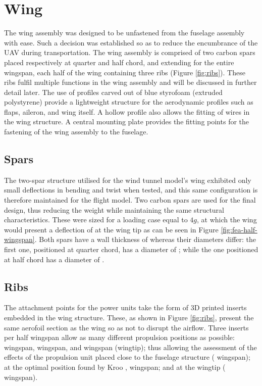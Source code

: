 \documentclass[../../main.tex]{subfiles}
\begin{document}

\section{Wing} \label{sec:final-design-proposal:wing}

The wing assembly was designed to be unfastened from the fuselage assembly with ease.
Such a decision was established so as to reduce the encumbrance of the UAV during transportation.
The wing assembly is comprised of two carbon spars placed respectively at quarter and half chord, and extending for the entire  wingspan, each half of the wing containing three ribs (Figure \ref{fig:ribs}).  %
These ribs fulfil multiple functions in the wing assembly and will be discussed in further detail later.
The use of profiles carved out of blue styrofoam (extruded polystyrene) provide a lightweight structure for the aerodynamic profiles such as flaps, aileron, and wing itself.
A hollow profile also allows the fitting of wires in the wing structure.
A central mounting plate provides the fitting points for the fastening of the wing assembly to the fuselage.

\subsection{Spars} \label{sec:final-design-proposal:wing:spars}

The two-spar structure utilised for the wind tunnel model's wing exhibited only small deflections in bending and twist when tested, and this same configuration is therefore maintained for the flight model.
Two carbon spars are used for the final design, thus reducing the weight while maintaining the same structural characteristics.
These were sized for a loading case equal to $4g$, at which the wing would present a deflection of  at the wing tip as can be seen in Figure \ref{fig:fea-half-wingspan}.
Both spars have a wall thickness of  whereas their diameters differ: the first one, positioned at quarter chord, has a diameter of ; while the one positioned at half chord has a diameter of .

\subsection{Ribs} \label{sec:final-design-proposal:wing:ribs}

The attachment points for the power units take the form of 3D printed inserts embedded in the wing structure.
These, as shown in Figure \ref{fig:ribs}, present the same aerofoil section as the wing so as not to disrupt the airflow.
Three inserts per half wingspan allow as many different propulsion positions as possible:  wingspan,  wingspan, and  wingspan (wingtip); thus allowing the assessment of the effects of the propulsion unit placed close to the fuselage structure ( wingspan); at the optimal position found by Kroo \cite{kroo-86},  wingspan; and at the wingtip ( wingspan).
\end{document}
